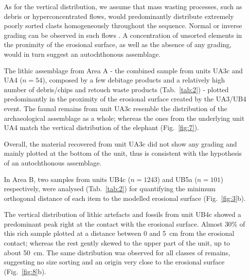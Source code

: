 \documentclass[review,authoryear,times]{elsarticle} %
\begin{document}

As for the vertical distribution, we assume that mass wasting processes, such as debris or hyperconcentrated flows, would predominantly distribute extremely poorly sorted clasts homogeneously throughout the sequence. Normal or inverse grading can be observed in such flows \citep{Pierson2005}. A concentration of unsorted elements in the proximity of the erosional surface, as well as the absence of any grading, would in turn suggest an autochthonous assemblage.


The lithic assemblage from Area A - the combined sample from units UA3c and UA4 ($n = 54$), composed by a few debitage products and a relatively high number of debris/chips and retouch waste products (Tab.~\ref{tab:2}) - plotted predominantly in the proximity of the erosional surface created by the UA3/UB4 event. The faunal remains from unit UA3c resemble the distribution of the archaeological assemblage as a whole; whereas the ones from the underlying unit UA4 match the vertical distribution of the elephant (Fig.~\ref{fig:7}).

Overall, the material recovered from unit UA3c did not show any grading and mainly plotted at the bottom of the unit, thus is consistent with the hypothesis of an autochthonous assemblage.


In Area B, two samples from units UB4c ($n = 1243$) and UB5a ($n = 101$) respectively, were analysed (Tab.~\ref{tab:2}) for quantifying the minimum orthogonal distance of each item to the modelled erosional surface (Fig.~\ref{fig:3}b).

The vertical distribution of lithic artefacts and fossils from unit UB4c showed a predominant peak right at the contact with the erosional surface. Almost 30\% of this rich sample plotted at a distance between 0 and 5~cm from the erosional contact; whereas the rest gently skewed to the upper part of the unit, up to about 50~cm. The same distribution was observed for all classes of remains, suggesting no size sorting and an origin very close to the erosional surface (Fig.~\ref{fig:8}b).
\end{document}
